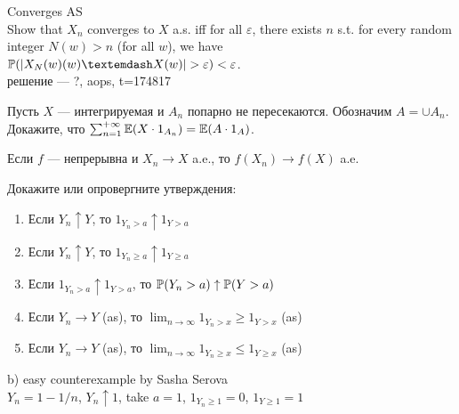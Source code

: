 \begin{problem}
Converges AS\\
Show that $X_{n}$ converges to $X$ a.s. iff for all $\varepsilon$, there exists $n$ s.t. for every random integer $N(w)>n$ (for all $w$), we have $\P(|X_N(w) (w) — X (w)| > \varepsilon) <\varepsilon$.\\
решение — ?, aops, t=174817

\begin{sol}

\end{sol}
\end{problem}

\begin{problem}
Пусть $X$ — интегрируемая и $A_{n}$ попарно не пересекаются.
Обозначим $A=\cup A_{n}$. Докажите, что
$\sum_{n=1}^{+\infty}\E(X\cdot 1_{A_{n}})=\E(A\cdot 1_{A})$.

\begin{sol}

\end{sol}
\end{problem}

\begin{problem}
Если $f$ — непрерывна и $X_{n}\rightarrow X$ a.e., то
$f(X_{n})\rightarrow f(X)$ a.e.

\begin{sol}

\end{sol}
\end{problem}

\begin{problem}
Докажите или опровергните утверждения:
\begin{enumerate}
\item Если $Y_{n}\uparrow Y$, то $1_{Y_{n}>a}\uparrow 1_{Y>a}$
\item Если $Y_{n}\uparrow Y$, то $1_{Y_{n}\ge a}\uparrow 1_{Y\ge a}$ \\
\item Если $1_{Y_{n}>a}\uparrow 1_{Y>a}$, то $\P(Y_{n}>a)\uparrow
\P(Y>a)$ \\
\item Если $Y_{n}\rightarrow Y$ (as), то
$\lim_{n\to\infty}1_{Y_{n}>x}\ge 1_{Y>x}$ (as) \\
\item Если $Y_{n}\rightarrow Y$ (as), то
$\lim_{n\to\infty}1_{Y_{n}\ge x}\le 1_{Y\ge x}$ (as)
\end{enumerate}

\begin{sol}

b) easy counterexample by Sasha Serova \\
$Y_{n}=1-1/n$, $Y_{n}\uparrow 1$, take $a=1$, $1_{Y_{n}\ge 1}=0$,
$1_{Y\ge 1}=1$
\end{sol}
\end{problem}

